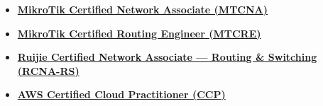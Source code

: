 \begin{itemize}
  \item \href{https://mikrotik.com/training/certificates/c718167cdeb7ed58514a}{\textbf{MikroTik Certified Network Associate (MTCNA)}}
  \item \href{https://mikrotik.com/training/certificates/c721407cc714d0352754}{\textbf{MikroTik Certified Routing Engineer (MTCRE)}}
  \item \href{https://www.linkedin.com/in/eric-julianto/overlay/Certifications/1216277271/treasury/?profileId=ACoAAFSJB6ABj2umTaBp_Y5x3AKPJfZPPteGLpE}{\textbf{Ruijie Certified Network Associate --- Routing \& Switching (RCNA-RS)}}
  \item \href{https://www.credly.com/badges/f6343257-05ea-47ec-ba96-c2eaa7996bf1}{\textbf{AWS Certified Cloud Practitioner (CCP)}}
\end{itemize}
